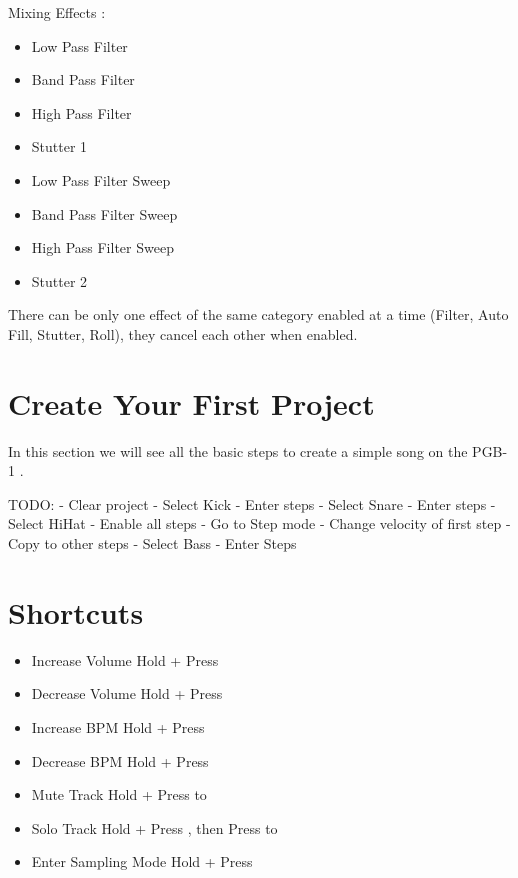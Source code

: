 \documentclass[8pt]{extarticle}
\def\device{PGB-1 }
\begin{document}
\begin{multicols*}{3}
\begin{multicols}{2}
    \columnbreak
    
    Mixing Effects :
    \begin{itemize}
    \item[\kbd{5}] Low Pass Filter
    \item[\kbd{6}] Band Pass Filter
    \item[\kbd{7}] High Pass Filter
    \item[\kbd{8}] Stutter 1
    \item[\kbd{13}] Low Pass Filter Sweep
    \item[\kbd{14}] Band Pass Filter Sweep
    \item[\kbd{15}] High Pass Filter Sweep
    \item[\kbd{16}] Stutter 2
    \end{itemize}
\end{multicols}

There can be only one effect of the same category enabled at a time (Filter, Auto Fill, Stutter, Roll), they cancel each other when enabled.

\section{Create Your First Project}

In this section we will see all the basic steps to create a simple song on the \device.

TODO:
 - Clear project
 - Select Kick
 - Enter steps
 - Select Snare
 - Enter steps
 - Select HiHat
 - Enable all steps
 - Go to Step mode
 - Change velocity of first step
 - Copy to other steps
 - Select Bass
 - Enter Steps


\section{Shortcuts}

\begin{itemize}
    \item[] Increase Volume \dotfill Hold  + Press 
    \item[] Decrease Volume \dotfill Hold  + Press 
    \item[] Increase BPM \dotfill Hold  + Press 
    \item[] Decrease BPM \dotfill Hold  + Press 
    \item[] Mute Track \dotfill Hold  + Press  to 
    \item[] Solo Track \dotfill Hold  + Press , then Press  to 
    \item[] Enter Sampling Mode \dotfill Hold  + Press 
\end{itemize}


\end{multicols*}
\end{document}
